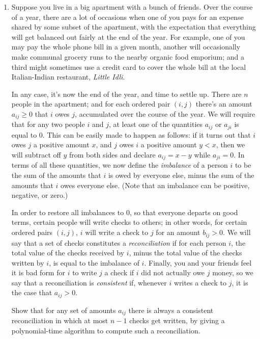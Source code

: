 \documentclass[12pt]{article}
\begin{document}
\begin{enumerate}
{}



\item

Suppose you live in a big apartment with a bunch of friends.
Over the course of a year, there are a lot of occasions
when one of you pays for an expense shared by some subset of the apartment,
with the expectation that everything will get balanced out fairly
at the end of the year.
For example, one of you may pay the whole phone bill in a given month,
another will occasionally make communal grocery runs to the nearby
organic food emporium; and a third might sometimes use a
credit card to cover the whole bill at the local
Italian-Indian restaurant, {\em Little Idli}.

In any case, it's now the end of the year, and time to settle up.
There are $n$ people in the apartment; and for
each ordered pair
$(i,j)$ there's an amount $a_{ij} \geq 0$ that $i$ owes $j$,
accumulated over the course of the year.
We will require that for any two people $i$ and $j$,
at least one of the quantities $a_{ij}$ or $a_{ji}$ is equal to $0$.
This can be easily made to happen as follows:
if it turns out that $i$ owes $j$ a positive amount $x$,
and $j$ owes $i$ a positive amount $y < x$, then we will
subtract off $y$ from both sides and declare $a_{ij} = x - y$
while $a_{ji} = 0$.
In terms of all these quantities, we now define the
{\em imbalance} of a person $i$ to be the sum of
the amounts that $i$ is owed by everyone else,
minus the sum of the amounts that $i$ owes everyone else.
(Note that an imbalance can be positive, negative, or zero.)

In order to restore all imbalances to $0$,
so that everyone departs on good terms,
certain people will write checks to others;
in other words, for certain ordered pairs $(i,j)$,
$i$ will write a check to $j$ for an amount $b_{ij} > 0$.
We will say that a set of checks constitutes a
{\em reconciliation} if for each person $i$,
the total value of the checks received by $i$,
minus the total value of the checks written by $i$,
is equal to the imbalance of $i$.
Finally, you and your friends feel it is bad form
for $i$ to write $j$ a check if $i$ did not actually
owe $j$ money, so we say that a reconciliation
is {\em consistent} if, whenever $i$ writes a check to $j$,
it is the case that $a_{ij} > 0$.

Show that for any set of amounts $a_{ij}$ there is
always a consistent reconciliation in which at most $n-1$ checks get written,
by giving a polynomial-time algorithm to compute such
a reconciliation.


\end{enumerate}
\end{document}
